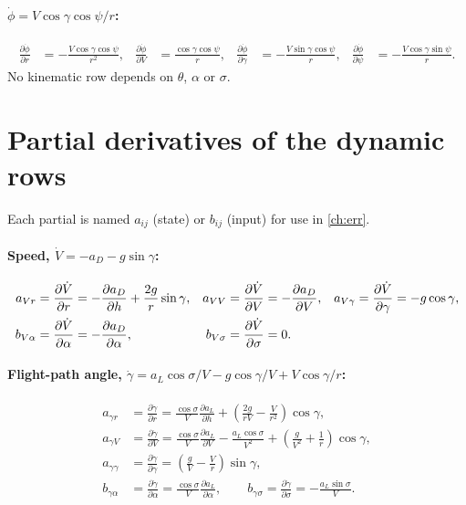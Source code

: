 \documentclass[11pt]{report}
\numberwithin{equation}{chapter}
\newcommand{\pd}[2]{\frac{\partial #1}{\partial #2}}
\newcommand{\aL}{a_L}
\newcommand{\aD}{a_D}
\begin{document}
\paragraph{$\dot\phi = V\cos\gamma\cos\psi/r$:}
\begin{align*}
  \pd{\dot\phi}{r} &= -\frac{V\cos\gamma\cos\psi}{r^2}, &
  \pd{\dot\phi}{V} &= \frac{\cos\gamma\cos\psi}{r}, &
  \pd{\dot\phi}{\gamma} &= -\frac{V\sin\gamma\cos\psi}{r}, &
  \pd{\dot\phi}{\psi} &= -\frac{V\cos\gamma\sin\psi}{r} .
\end{align*}
No kinematic row depends on $\theta$, $\alpha$ or $\sigma$.

\section{Partial derivatives of the dynamic rows}

Each partial is named $a_{ij}$ (state) or $b_{ij}$ (input) for use in \cref{ch:err}.

\paragraph{Speed, $\dot V = -\aD - g\sin\gamma$:}
\begin{align}
  a_{Vr} &= \pd{\dot V}{r} = -\pd{\aD}{h} + \frac{2g}{r}\sin\gamma, &
  a_{VV} &= \pd{\dot V}{V} = -\pd{\aD}{V}, &
  a_{V\gamma} &= \pd{\dot V}{\gamma} = -g\cos\gamma, \\
  b_{V\alpha} &= \pd{\dot V}{\alpha} = -\pd{\aD}{\alpha}, &
  b_{V\sigma} &= \pd{\dot V}{\sigma} = 0 . \notag
\end{align}

\paragraph{Flight-path angle, $\dot\gamma = \aL\cos\sigma/V - g\cos\gamma/V + V\cos\gamma/r$:}
\begin{align}
  a_{\gamma r} &= \pd{\dot\gamma}{r} = \frac{\cos\sigma}{V}\pd{\aL}{h}
     + \left(\frac{2g}{rV} - \frac{V}{r^2}\right)\cos\gamma, \\
  a_{\gamma V} &= \pd{\dot\gamma}{V} = \frac{\cos\sigma}{V}\pd{\aL}{V} - \frac{\aL\cos\sigma}{V^2}
     + \left(\frac{g}{V^2} + \frac1r\right)\cos\gamma, \\
  a_{\gamma\gamma} &= \pd{\dot\gamma}{\gamma} = \left(\frac{g}{V} - \frac{V}{r}\right)\sin\gamma, \\
  b_{\gamma\alpha} &= \pd{\dot\gamma}{\alpha} = \frac{\cos\sigma}{V}\pd{\aL}{\alpha}, \qquad
  b_{\gamma\sigma} = \pd{\dot\gamma}{\sigma} = -\frac{\aL\sin\sigma}{V} .
\end{align}
\end{document}

